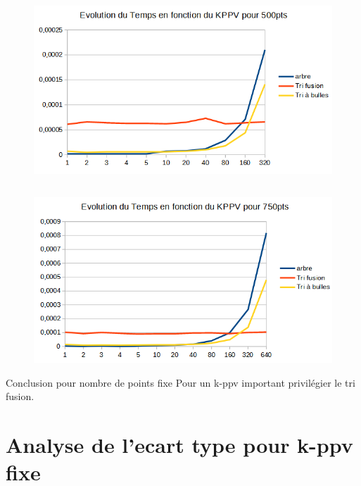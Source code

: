\documentclass{beamer}
\begin{document}
\begin{frame}
\begin{columns}
    \begin{figure}
      \includegraphics[width=\textwidth]{Beamer/K_500_M2.png}
    \end{figure}
\end{columns}
\end{frame}

\begin{frame}
\begin{figure}
      \includegraphics[width=\textwidth]{Beamer/K_750_M2.png}
\end{figure}
\begin{block}{Conclusion pour nombre de points fixe}
Pour un k-ppv important privilégier le tri fusion.
\end{block}
\end{frame}

\section{Analyse de l'ecart type pour k-ppv fixe}
\end{document}
